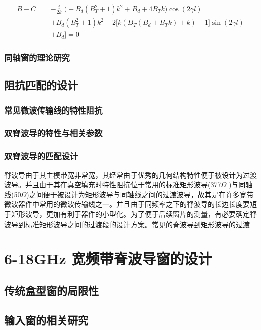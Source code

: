\documentclass[master]{thesis-uestc}
\begin{document}
\begin{equation}\label{eq:B-C}
    \begin{split}
        B - C = & -\frac{i}{2k} \Big[ \big(-B_{d}(B_{T}^2 + 1)k^2 + B_{d} + 4B_{T}k\big)\cos(2\gamma l) \\
                & + B_{d}(B_{T}^2 + 1)k^2 - 2\big[k(B_{T}(B_{d} + B_{T}k) + k) - 1\big]\sin(2\gamma l) \\
                & + B_{d} \Big] = 0
    \end{split}
\end{equation}
\subsection{同轴窗的理论研究}
\section{阻抗匹配的设计}
\subsection{常见微波传输线的特性阻抗}

\subsection{双脊波导的特性与相关参数}

\subsection{双脊波导的匹配设计}
脊波导由于其主模带宽非常宽，其经常由于优秀的几何结构特性便于被设计为过渡波导。并且由于其在真空填充时特性阻抗位于常用的标准矩形波导(377$\Omega$ )与同轴线(50$\Omega$)之间便于被设计为矩形波导与同轴线之间的过渡波导，故其是在许多宽带微波器件中常用的微波传输线之一。并且由于同频率之下的脊波导的长边长度要短于矩形波导，更加有利于器件的小型化。为了便于后续窗片的测量，有必要确定脊波导到标准矩形波导之间的过渡段的设计方案。常见的脊波导到矩形波导的过渡
\chapter{6-18GHz 宽频带脊波导窗的设计}
\section{传统盒型窗的局限性}
\section{输入窗的相关研究}
\end{document}
